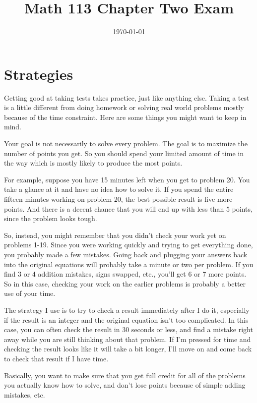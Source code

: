 \documentclass[fleqn,addpoints]{exam}
\title{Math 113 Chapter Two Exam}
\author{}
\date{\today}
\begin{document}
\maketitle

\ifprintanswers
\section{Strategies}

Getting good at taking tests takes practice, just like anything else.  Taking a test is a little different from doing
homework or solving real world problems mostly because of the time constraint.  Here are some things you might want to
keep in mind.

Your goal is not necessarily to solve every problem.  The goal is to maximize the number of points you get.  So you
should spend your limited amount of time in the way which is mostly likely to produce the 
most points.

For example, suppose you have 15 minutes left when you get to problem 20.  You take a glance at it and have no idea how to solve it.  If you spend the entire fifteen minutes working on problem 20, the best possible result is five more
points.  And there is a decent chance that you will end up with less than 5 points, since the problem looks tough.

So, instead, you might remember that you didn't check your work yet on problems 1-19.  Since you were working quickly and
trying to get everything done, you probably made a few mistakes.  Going back and plugging your answers back into the
original equations will probably take a minute or two per problem.  If you find 3 or 4 addition mistakes, signs swapped,
etc., you'll get 6 or 7 more points.  So in this case, checking your work on the earlier problems is probably a better
use of your time.

The strategy I use is to try to check a result immediately after I do it, especially if the result is an integer and the
original equation isn't too complicated.  In this case, you can often check the result in 30 seconds or less, and find a
mistake right away while you are still thinking about that problem.  If I'm pressed for time and checking the result
looks like it will take a bit longer, I'll move on and come back to check that result if I have time.

Basically, you want to make sure that you get full credit for all of the problems you actually know how to solve, and
don't lose points because of simple adding mistakes, etc.
\end{document}
